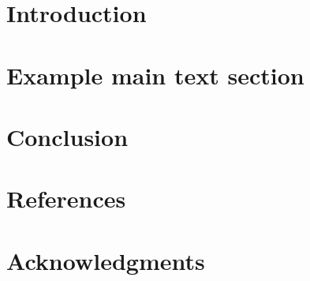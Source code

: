 \newif\iflinenumbers
\linenumberstrue  %









\clearpage


\tableofcontents
\clearpage


\section{Introduction}



\section{Example main text section}\label{SEC:Main}



\section{Conclusion}




\clearpage

\section{References}
\customprintbibliography


\clearpage
\section{Acknowledgments}


